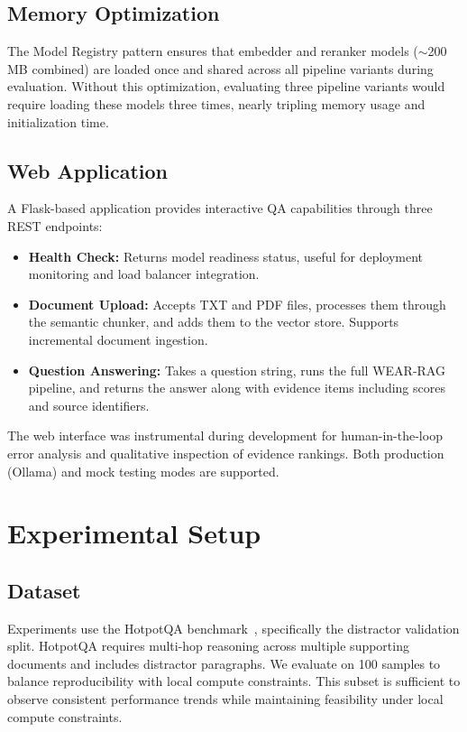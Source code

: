 \documentclass[conference]{IEEEtran}
\begin{document}
\subsection{Memory Optimization}

The Model Registry pattern ensures that embedder and reranker models ($\sim$200 MB combined) are loaded once and shared across all pipeline variants during evaluation. Without this optimization, evaluating three pipeline variants would require loading these models three times, nearly tripling memory usage and initialization time.

\subsection{Web Application}

A Flask-based application provides interactive QA capabilities through three REST endpoints:
\begin{itemize}[leftmargin=*]
\item \textbf{Health Check:} Returns model readiness status, useful for deployment monitoring and load balancer integration.
\item \textbf{Document Upload:} Accepts TXT and PDF files, processes them through the semantic chunker, and adds them to the vector store. Supports incremental document ingestion.
\item \textbf{Question Answering:} Takes a question string, runs the full WEAR-RAG pipeline, and returns the answer along with evidence items including scores and source identifiers.
\end{itemize}

The web interface was instrumental during development for human-in-the-loop error analysis and qualitative inspection of evidence rankings. Both production (Ollama) and mock testing modes are supported.


\section{Experimental Setup}

\subsection{Dataset}
Experiments use the HotpotQA benchmark~\cite{yang2018hotpotqa}, specifically the distractor validation split. HotpotQA requires multi-hop reasoning across multiple supporting documents and includes distractor paragraphs. We evaluate on 100 samples to balance reproducibility with local compute constraints. This subset is sufficient to observe consistent performance trends while maintaining feasibility under local compute constraints.
\end{document}
